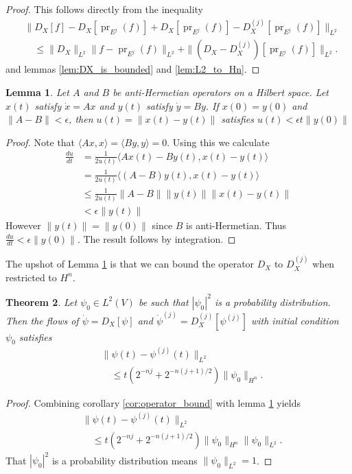 \documentclass[letterpaper, 10 pt, conference]{ieeeconf}
\newtheorem{thm}{Theorem}[section]
\newtheorem{lem}[thm]{Lemma}
\DeclareMathOperator{\pr}{pr}
\begin{document}
  \begin{proof}
    This follows directly from the inequality
    \begin{align*}
      &\| D_X [f] - D_X[\pr_{E^j}(f)] + D_X[\pr_{E^j}(f)] - D_X^{(j)}[\pr_{E^j}(f)] \|_{L^2} \\
      &\quad \leq \|D_X\|_{L^2} \| f - \pr_{E^j}(f)\|_{L^2}
      + \| (D_X - D_X^{(j)}) [\pr_{E^j}(f)] \|_{L^2}.
    \end{align*}
    and lemmas \ref{lem:DX_is_bounded} and \ref{lem:L2_to_Hn}.
  \end{proof}

  \begin{lem} \label{lem:flow_bound}
    Let $A$ and $B$ be anti-Hermetian operators on a Hilbert space.
    Let $x(t)$ satisfy $\dot{x} = Ax$ and $y(t)$ satisfy $\dot{y} = By$.
    If $x(0) = y(0)$ and $\| A - B \| < \epsilon$, then $u(t) = \| x(t) - y(t) \|$ satisfies $u(t) < \epsilon t \| y(0) \|$
  \end{lem}
 
  \begin{proof}
    Note that $\langle Ax,x\rangle = \langle By,y \rangle = 0$.
    Using this we calculate
    \begin{align*}
      \frac{du}{dt} &= \frac{1}{2u(t)} \langle
      Ax(t) - By(t) , x(t) - y(t) \rangle \\
      &= \frac{1}{2u(t)} \langle
      (A-B)y(t) , x(t) - y(t) \rangle \\
      &\leq \frac{1}{2u(t)} \| A-B\|  \|y(t)\|  \|x(t) - y(t) \| \\
      &< \epsilon \|y(t) \|
    \end{align*}
    However $\| y(t) \| = \| y(0) \|$ since $B$ is anti-Hermetian.
    Thus $\frac{du}{dt} < \epsilon \| y(0) \|$.
    The result follows by integration.
  \end{proof}
  The upshot of Lemma \ref{lem:flow_bound} is that we can bound the
  operator $D_X$ to $D_X^{(j)}$ when restricted to $H^n$.
  \begin{thm}\label{thm:convergence}
    Let $\psi_0 \in L^2(V)$ be such that $|\psi_0|^2$ is a probability distribution.
    Then the flows of $\dot{\psi} = D_X[\psi]$ and $\dot{\psi}^{(j)} = D_X^{(j)}[\psi^{(j)}]$ with initial condition $\psi_0$
    satisfies
    \begin{align*}
      &\| \psi(t) - \psi^{(j)}(t) \|_{L^2}  \\
      &\quad\leq t( 2^{-nj} + 2^{-n(j+1)/2}) \| \psi_0\|_{H^n} .
    \end{align*}
  \end{thm}
  \begin{proof}
    Combining corollary \ref{cor:operator_bound} with lemma \ref{lem:flow_bound}
    yields
    \begin{align*}
      &\| \psi(t) - \psi^{(j)}(t) \|_{L^2}  \\
      &\quad\leq t( 2^{-nj} + 2^{-n(j+1)/2}) \| \psi_0 \|_{H^n} \| \psi_0 \|_{L^2}.
    \end{align*}
    That $|\psi_0|^2$ is a probability distribution means $\| \psi_0\|_{L^2} = 1$.
  \end{proof}
\end{document}
